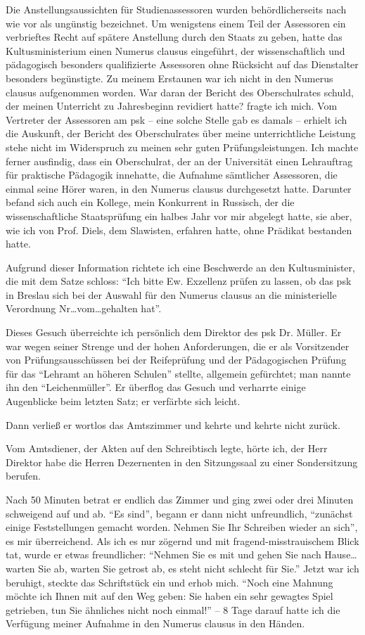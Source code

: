 \documentclass[a5paper,pagesize,10pt,twoside=true]{scrbook}
\begin{document}
Die Anstellungsaussichten für Studienassessoren wurden behördlicherseits nach wie vor als ungünstig bezeichnet. Um wenigstens einem Teil der Assessoren ein verbrieftes Recht auf spätere Anstellung durch den Staats zu geben, hatte das Kultusministerium einen Numerus clausus eingeführt, der wissenschaftlich und pädagogisch besonders qualifizierte Assessoren ohne Rücksicht auf das Dienstalter besonders begünstigte. Zu meinem Erstaunen war ich nicht in den Numerus clausus aufgenommen worden. War daran der Bericht des Oberschulrates schuld, der meinen Unterricht zu Jahresbeginn revidiert hatte? fragte ich mich. Vom Vertreter der Assessoren am \ac{psk} -- eine solche Stelle gab es damals -- erhielt ich die Auskunft, der Bericht des Oberschulrates über meine unterrichtliche Leistung stehe nicht im Widerspruch zu meinen sehr guten Prüfungsleistungen. Ich machte ferner ausfindig, dass ein Oberschulrat, der an der Universität einen Lehrauftrag für praktische Pädagogik innehatte, die Aufnahme sämtlicher Assessoren, die einmal seine Hörer waren, in den Numerus clausus durchgesetzt hatte. Darunter befand sich auch ein Kollege, mein Konkurrent in Russisch, der die wissenschaftliche Staatsprüfung ein halbes Jahr vor mir abgelegt hatte, sie aber, wie ich von Prof. Diels, dem Slawisten, erfahren hatte, ohne Prädikat bestanden hatte.

Aufgrund dieser Information richtete ich eine Beschwerde an den Kultusminister, die mit dem Satze schloss: \enquote{Ich bitte Ew. Exzellenz prüfen zu lassen, ob das \ac{psk} in Breslau sich bei der Auswahl für den Numerus clausus an die ministerielle Verordnung Nr\dots vom\dots gehalten hat}.

Dieses Gesuch überreichte ich persönlich dem Direktor des \ac{psk} Dr. Müller. Er war wegen seiner Strenge und der hohen Anforderungen, die er als Vorsitzender von Prüfungsausschüssen bei der Reifeprüfung und der Pädagogischen Prüfung für das \enquote{Lehramt an höheren Schulen} stellte, allgemein gefürchtet; man nannte ihn den \enquote{Leichenmüller}. Er überflog das Gesuch und verharrte einige Augenblicke beim letzten Satz; er verfärbte sich leicht.

Dann verließ er wortlos das Amtszimmer und kehrte und kehrte nicht zurück.

Vom Amtsdiener, der Akten auf den Schreibtisch legte, hörte ich, der Herr Direktor habe die Herren Dezernenten in den Sitzungssaal zu einer Sondersitzung berufen.

Nach 50 Minuten betrat er endlich das Zimmer und ging zwei oder drei Minuten schweigend auf und ab. \enquote{Es sind}, begann er dann nicht unfreundlich, \enquote{zunächst einige Feststellungen gemacht worden. Nehmen Sie Ihr Schreiben wieder an sich}, es mir überreichend. Als ich es nur zögernd und mit fragend-misstrauischem Blick tat, wurde er etwas freundlicher: \enquote{Nehmen Sie es mit und gehen Sie nach Hause\dots warten Sie ab, warten Sie getrost ab, es steht nicht schlecht für Sie.} Jetzt war ich beruhigt, steckte das Schriftstück ein und erhob mich. \enquote{Noch eine Mahnung möchte ich Ihnen mit auf den Weg geben: Sie haben ein sehr gewagtes Spiel getrieben, tun Sie ähnliches nicht noch einmal!} -- 8 Tage darauf hatte ich die Verfügung meiner Aufnahme in den Numerus clausus in den Händen.
\end{document}

